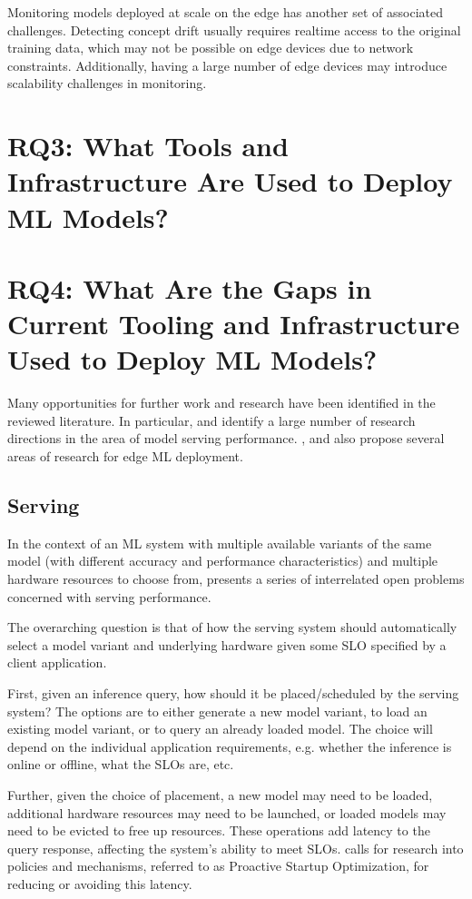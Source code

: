 Monitoring models deployed at scale on the edge has another set of associated challenges.
Detecting concept drift usually requires realtime access to the original training data, which may not be possible on edge devices due to network constraints.
Additionally, having a large number of edge devices may introduce scalability challenges \cite{Rausch2019} in monitoring.

\section{RQ3: What Tools and Infrastructure Are Used to Deploy ML Models?}
\section{RQ4: What Are the Gaps in Current Tooling and Infrastructure Used to Deploy ML Models?}

Many opportunities for further work and research have been identified in the reviewed literature.
In particular, \cite{Yadwadkar2019} and \cite{Zhang2020} identify a large number of research directions in the area of model serving performance.
\cite{Bosch2021}, \cite{Rausch2019} and \cite{Gupta2020} also propose several areas of research for edge ML deployment.

\subsection{Serving}
In the context of an ML system with multiple available variants of the same model (with different accuracy and performance characteristics) and multiple hardware resources to choose from, \cite{Yadwadkar2019} presents a series of interrelated open problems concerned with serving performance.

The overarching question is that of how the serving system should automatically select a model variant and underlying hardware given some SLO specified by a client application.

First, given an inference query, how should it be placed/scheduled by the serving system?
The options are to either generate a new model variant, to load an existing model variant, or to query an already loaded model.
The choice will depend on the individual application requirements, e.g. whether the inference is online or offline, what the SLOs are, etc.

Further, given the choice of placement, a new model may need to be loaded, additional hardware resources may need to be launched, or loaded models may need to be evicted to free up resources.
These operations add latency to the query response, affecting the system's ability to meet SLOs.
\cite{Yadwadkar2019} calls for research into policies and mechanisms, referred to as Proactive Startup Optimization, for reducing or avoiding this latency.

